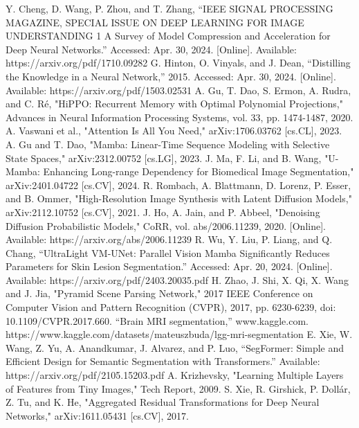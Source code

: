 \documentclass[conference]{IEEEtran}
\begin{document}
\begin{thebibliography}{00}
     Y. Cheng, D. Wang, P. Zhou, and T. Zhang, “IEEE SIGNAL PROCESSING MAGAZINE, SPECIAL ISSUE ON DEEP LEARNING FOR IMAGE UNDERSTANDING 1 A Survey of Model Compression and Acceleration for Deep Neural Networks.” Accessed: Apr. 30, 2024. [Online]. Available: https://arxiv.org/pdf/1710.09282
     G. Hinton, O. Vinyals, and J. Dean, “Distilling the Knowledge in a Neural Network,” 2015. Accessed: Apr. 30, 2024. [Online]. Available: https://arxiv.org/pdf/1503.02531
     A. Gu, T. Dao, S. Ermon, A. Rudra, and C. Ré, "HiPPO: Recurrent Memory with Optimal Polynomial Projections," Advances in Neural Information Processing Systems, vol. 33, pp. 1474-1487, 2020.
     A. Vaswani et al., "Attention Is All You Need," arXiv:1706.03762 [cs.CL], 2023.
     A. Gu and T. Dao, "Mamba: Linear-Time Sequence Modeling with Selective State Spaces," arXiv:2312.00752 [cs.LG], 2023.
     J. Ma, F. Li, and B. Wang, "U-Mamba: Enhancing Long-range Dependency for Biomedical Image Segmentation," arXiv:2401.04722 [cs.CV], 2024.
     R. Rombach, A. Blattmann, D. Lorenz, P. Esser, and B. Ommer, "High-Resolution Image Synthesis with Latent Diffusion Models," arXiv:2112.10752 [cs.CV], 2021.
     J. Ho, A. Jain, and P. Abbeel, "Denoising Diffusion Probabilistic Models," CoRR, vol. abs/2006.11239, 2020. [Online]. Available: https://arxiv.org/abs/2006.11239
     R. Wu, Y. Liu, P. Liang, and Q. Chang, “UltraLight VM-UNet: Parallel Vision Mamba Significantly Reduces Parameters for Skin Lesion Segmentation.” Accessed: Apr. 20, 2024. [Online]. Available: https://arxiv.org/pdf/2403.20035.pdf
     H. Zhao, J. Shi, X. Qi, X. Wang and J. Jia, "Pyramid Scene Parsing Network," 2017 IEEE Conference on Computer Vision and Pattern Recognition (CVPR), 2017, pp. 6230-6239, doi: 10.1109/CVPR.2017.660.
     “Brain MRI segmentation,” www.kaggle.com. https://www.kaggle.com/datasets/mateuszbuda/lgg-mri-segmentation
     E. Xie, W. Wang, Z. Yu, A. Anandkumar, J. Alvarez, and P. Luo, “SegFormer: Simple and Efficient Design for Semantic Segmentation with Transformers.” Available: https://arxiv.org/pdf/2105.15203.pdf
     A. Krizhevsky, "Learning Multiple Layers of Features from Tiny Images," Tech Report, 2009.
     S. Xie, R. Girshick, P. Dollár, Z. Tu, and K. He, "Aggregated Residual Transformations for Deep Neural Networks," arXiv:1611.05431 [cs.CV], 2017.

\end{thebibliography}
\end{document}

